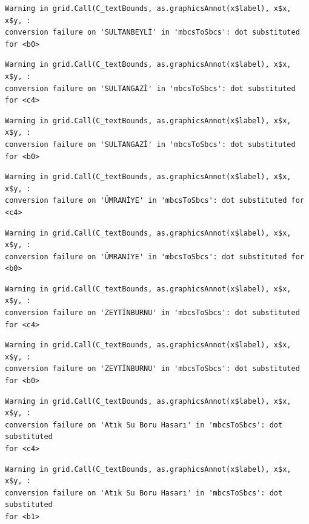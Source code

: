 \documentclass[
  11pt,
  a4paper,
  DIV=11,
  numbers=noendperiod]{scrartcl}
\begin{document}
\begin{verbatim}
Warning in grid.Call(C_textBounds, as.graphicsAnnot(x$label), x$x, x$y, :
conversion failure on 'SULTANBEYLİ' in 'mbcsToSbcs': dot substituted for <b0>
\end{verbatim}

\begin{verbatim}
Warning in grid.Call(C_textBounds, as.graphicsAnnot(x$label), x$x, x$y, :
conversion failure on 'SULTANGAZİ' in 'mbcsToSbcs': dot substituted for <c4>
\end{verbatim}

\begin{verbatim}
Warning in grid.Call(C_textBounds, as.graphicsAnnot(x$label), x$x, x$y, :
conversion failure on 'SULTANGAZİ' in 'mbcsToSbcs': dot substituted for <b0>
\end{verbatim}

\begin{verbatim}
Warning in grid.Call(C_textBounds, as.graphicsAnnot(x$label), x$x, x$y, :
conversion failure on 'ÜMRANİYE' in 'mbcsToSbcs': dot substituted for <c4>
\end{verbatim}

\begin{verbatim}
Warning in grid.Call(C_textBounds, as.graphicsAnnot(x$label), x$x, x$y, :
conversion failure on 'ÜMRANİYE' in 'mbcsToSbcs': dot substituted for <b0>
\end{verbatim}

\begin{verbatim}
Warning in grid.Call(C_textBounds, as.graphicsAnnot(x$label), x$x, x$y, :
conversion failure on 'ZEYTİNBURNU' in 'mbcsToSbcs': dot substituted for <c4>
\end{verbatim}

\begin{verbatim}
Warning in grid.Call(C_textBounds, as.graphicsAnnot(x$label), x$x, x$y, :
conversion failure on 'ZEYTİNBURNU' in 'mbcsToSbcs': dot substituted for <b0>
\end{verbatim}

\begin{verbatim}
Warning in grid.Call(C_textBounds, as.graphicsAnnot(x$label), x$x, x$y, :
conversion failure on 'Atık Su Boru Hasarı' in 'mbcsToSbcs': dot substituted
for <c4>
\end{verbatim}

\begin{verbatim}
Warning in grid.Call(C_textBounds, as.graphicsAnnot(x$label), x$x, x$y, :
conversion failure on 'Atık Su Boru Hasarı' in 'mbcsToSbcs': dot substituted
for <b1>
\end{verbatim}
\end{document}
